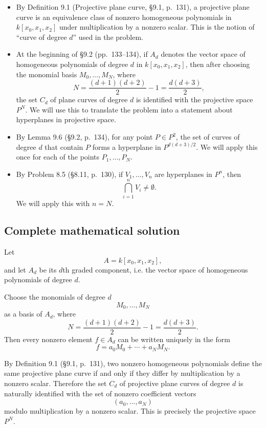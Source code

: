 \documentclass[a4paper,12pt,openany]{article}
\theoremstyle{plain}
\theoremstyle{definition}
\theoremstyle{remark}
\begin{document}
\begin{itemize}
    \item By Definition 9.1 (Projective plane curve, \S9.1, p.~131), a
    projective plane curve is an equivalence class of nonzero homogeneous
    polynomials in $k[x_0,x_1,x_2]$ under multiplication by a nonzero scalar.
    This is the notion of ``curve of degree $d$'' used in the problem.

    \item At the beginning of \S9.2 (pp.~133--134), if $A_d$ denotes the
    vector space of homogeneous polynomials of degree $d$ in
    $k[x_0,x_1,x_2]$, then after choosing the monomial basis
    $M_0,\dots,M_N$, where
    \[
    N=\frac{(d+1)(d+2)}{2}-1=\frac{d(d+3)}{2},
    \]
    the set $C_d$ of plane curves of degree $d$ is identified with the
    projective space $P^N$. We will use this to translate the problem into
    a statement about hyperplanes in projective space.

    \item By Lemma 9.6 (\S9.2, p.~134), for any point $P\in P^2$, the set
    of curves of degree $d$ that contain $P$ forms a hyperplane in
    $P^{d(d+3)/2}$. We will apply this once for each of the points
    $P_1,\dots,P_N$.

    \item By Problem 8.5 (\S8.11, p.~130), if $V_1,\dots,V_n$ are
    hyperplanes in $P^n$, then
    \[
    \bigcap_{i=1}^n V_i \neq \emptyset.
    \]
    We will apply this with $n=N$.
\end{itemize}

\subsection*{Complete mathematical solution}

Let
\[
A=k[x_0,x_1,x_2],
\]
and let $A_d$ be its $d$th graded component, i.e. the vector space of
homogeneous polynomials of degree $d$.

Choose the monomials of degree $d$
\[
M_0,\dots,M_N
\]
as a basis of $A_d$, where
\[
N=\frac{(d+1)(d+2)}{2}-1=\frac{d(d+3)}{2}.
\]
Then every nonzero element $f\in A_d$ can be written uniquely in the form
\[
f=a_0M_0+\cdots+a_NM_N.
\]

By Definition 9.1 (\S9.1, p.~131), two nonzero homogeneous polynomials
define the same projective plane curve if and only if they differ by
multiplication by a nonzero scalar. Therefore the set $C_d$ of projective
plane curves of degree $d$ is naturally identified with the set of nonzero
coefficient vectors
\[
(a_0,\dots,a_N)
\]
modulo multiplication by a nonzero scalar. This is precisely the projective
space $P^N$.
\end{document}
